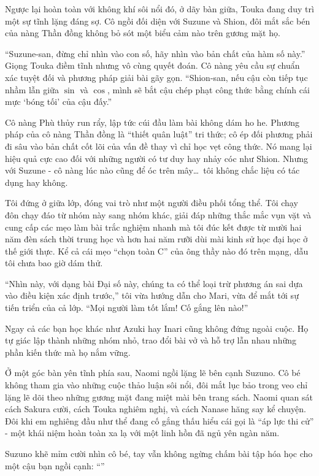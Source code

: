 \documentclass[../main.tex]{subfiles}
\begin{document}
Ngược lại hoàn toàn với không khí sôi nổi đó, ở dãy bàn giữa, Touka đang duy trì một sự tĩnh lặng đáng sợ. Cô ngồi đối diện với Suzune và Shion, đôi mắt sắc bén của nàng Thần đồng không bỏ sót một biểu cảm nào trên gương mặt họ.

``Suzune-san, đừng chỉ nhìn vào con số, hãy nhìn vào bản chất của hàm số này.'' Giọng Touka điềm tĩnh nhưng vô cùng quyết đoán. Cô nàng yêu cầu sự chuẩn xác tuyệt đối và phương pháp giải bài gãy gọn. ``Shion-san, nếu cậu còn tiếp tục nhầm lẫn giữa $\sin$ và $\cos$, mình sẽ bắt cậu chép phạt công thức bằng chính cái mực `bóng tối' của cậu đấy.''

Cô nàng Phù thủy run rẩy, lập tức cúi đầu làm bài không dám ho he. Phương pháp của cô nàng Thần đồng là ``thiết quân luật'' tri thức; cô ép đối phương phải đi sâu vào bản chất cốt lõi của vấn đề thay vì chỉ học vẹt công thức. Nó mang lại hiệu quả cực cao đối với những người có tư duy hay nhảy cóc như Shion. Nhưng với Suzune - cô nàng lúc nào cũng để óc trên mây\dots\ tôi không chắc liệu có tác dụng hay không.

Tôi đứng ở giữa lớp, đóng vai trò như một người điều phối tổng thể. Tôi chạy đôn chạy đáo từ nhóm này sang nhóm khác, giải đáp những thắc mắc vụn vặt và cung cấp các mẹo làm bài trắc nghiệm nhanh mà tôi đúc kết được từ mười hai năm đèn sách thời trung học và hơn hai năm rưỡi dùi mài kinh sử học đại học ở thế giới thực. Kể cả cái mẹo ``chọn toàn C'' của ông thầy nào đó trên mạng, dẫu tôi chưa bao giờ dám thử.

``Nhìn này, với dạng bài Đại số này, chúng ta có thể loại trừ phương án sai dựa vào điều kiện xác định trước,'' tôi vừa hướng dẫn cho Mari, vừa để mắt tới sự tiến triển của cả lớp. ``Mọi người làm tốt lắm! Cố gắng lên nào!''

Ngay cả các bạn học khác như Azuki hay Inari cũng không đứng ngoài cuộc. Họ tự giác lập thành những nhóm nhỏ, trao đổi bài vở và hỗ trợ lẫn nhau những phần kiến thức mà họ nắm vững.

Ở một góc bàn yên tĩnh phía sau, Naomi ngồi lặng lẽ bên cạnh Suzuno. Cô bé không tham gia vào những cuộc thảo luận sôi nổi, đôi mắt lục bảo trong veo chỉ lặng lẽ dõi theo những gương mặt đang miệt mài bên trang sách. Naomi quan sát cách Sakura cười, cách Touka nghiêm nghị, và cách Nanase hăng say kể chuyện. Đôi khi em nghiêng đầu như thể đang cố gắng thấu hiểu cái gọi là ``áp lực thi cử'' - một khái niệm hoàn toàn xa lạ với một linh hồn đã ngủ yên ngàn năm.

Suzuno khẽ mỉm cười nhìn cô bé, tay vẫn không ngừng chấm bài tập hóa học cho một cậu bạn ngồi cạnh: ``''
\end{document}
